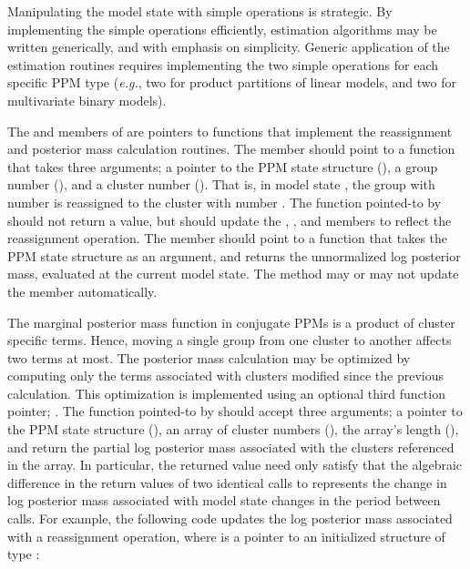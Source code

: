 \documentclass[article, nojss]{jss}
\begin{document}
Manipulating the model state with simple operations is strategic. By implementing the simple operations efficiently, estimation algorithms may be written generically, and with emphasis on simplicity. Generic application of the estimation routines requires implementing the two simple operations for each specific PPM type ({\it e.g.}, two for product partitions of linear models, and two for multivariate binary models).

The  and  members of  are pointers to  functions that implement the reassignment and posterior mass calculation routines. The  member should point to a function that takes three arguments; a pointer to the PPM state structure (), a group number (), and a cluster number (). That is, in model state , the group with number  is reassigned to the cluster with number . The function pointed-to by  should not return a value, but should update the , , and  members to reflect the reassignment operation. The  member should point to a function that takes the PPM state structure as an argument, and returns the unnormalized log posterior mass, evaluated at the current model state. The  method may or may not update the  member automatically.

The marginal posterior mass function in conjugate PPMs is a product of cluster specific terms. Hence, moving a single group from one cluster to another affects two terms at most. The posterior mass calculation may be optimized by computing only the terms associated with clusters modified since the previous calculation. This optimization is implemented using an optional third  function pointer; . The function pointed-to by  should accept three arguments; a pointer to the PPM state structure (), an array of cluster numbers (), the array's length (), and return the partial log posterior mass associated with the clusters referenced in the  array. In particular, the returned value need only satisfy that the algebraic difference in the return values of two identical calls to  represents the change in log posterior mass associated with model state changes in the period between calls. For example, the following  code updates the log posterior mass associated with a reassignment operation, where  is a pointer to an initialized structure of type :  
\end{document}
